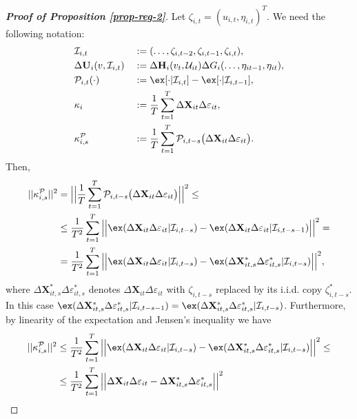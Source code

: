 \begin{proof}[\textnormal{\textbf{Proof of Proposition \ref{prop-reg-2}}}]
Let $\zeta_{i,t} = (u_{i, t}, \eta_{i, t})^T$. We need the following notation:
\begin{alignat*}{2}
&\mathcal{I}_{i,t} &&:= (\ldots, \zeta_{i, t-2}, \zeta_{i, t-1}, \zeta_{i,t}),\\
&\Delta \mathbf{U}_i(v, \mathcal{I}_{i, t}) &&:= \Delta \mathbf{H}_i(v_t, \mathcal{U}_{it}) \Delta G_i(\ldots, \eta_{it-1}, \eta_{it}),\\
&\mathcal{P}_{i,t}(\cdot) &&:= \ex[\cdot|\mathcal{I}_{i, t}] -\ex[\cdot|\mathcal{I}_{i, t-1}], \\
&\kappa_{i} && := \frac{1}{T}\sum_{t=1}^T  \Delta \mathbf{X}_{it}\Delta \varepsilon_{it}, \\
&\kappa_{i, s}^{\mathcal{P}} && := \frac{1}{T}\sum_{t=1}^T \mathcal{P}_{i, t-s}\big( \Delta \mathbf{X}_{it}\Delta \varepsilon_{it}\big).
\end{alignat*}
Then,
\begin{align*}
||\kappa_{i, s}^{\mathcal{P}}||^2 &= \Big|\Big| \frac{1}{T}\sum_{t=1}^T \mathcal{P}_{i, t-s}\big( \Delta \mathbf{X}_{it}\Delta \varepsilon_{it}\big) \Big|\Big|^2 \leq\\
&\leq \frac{1}{T^2} \sum_{t=1}^T \Big|\Big| \ex (\Delta \mathbf{X}_{it}\Delta \varepsilon_{it}|\mathcal{I}_{i, t-s}) -\ex (\Delta \mathbf{X}_{it}\Delta \varepsilon_{it}|\mathcal{I}_{i, t-s-1}) \Big|\Big|^2 =\\
&= \frac{1}{T^2} \sum_{t=1}^T \Big|\Big| \ex (\Delta \mathbf{X}_{it}\Delta \varepsilon_{it}|\mathcal{I}_{i, t-s}) -\ex (\Delta \mathbf{X}_{it, s}^*\Delta \varepsilon_{it, s}^*|\mathcal{I}_{i, t-s}) \Big|\Big|^2,
\end{align*}
where $\Delta \mathbf{X}_{it, s}^*\Delta \varepsilon_{it, s}^*$ denotes $\Delta \mathbf{X}_{it}\Delta \varepsilon_{it}$ with $\zeta_{i, t-s}$ replaced by its i.i.d. copy $\zeta_{i, t-s}^*$. In this case $\ex (\Delta \mathbf{X}_{it, s}^*\Delta \varepsilon_{it, s}^*|\mathcal{I}_{i, t-s -1}) = \ex (\Delta \mathbf{X}_{it, s}^*\Delta \varepsilon_{it, s}^*|\mathcal{I}_{i, t-s})$. Furthermore, by linearity of the expectation and Jensen's inequality we have 
\begin{align*}
||\kappa_{i, s}^{\mathcal{P}}||^2 &\leq \frac{1}{T^2} \sum_{t=1}^T \Big|\Big| \ex (\Delta \mathbf{X}_{it}\Delta \varepsilon_{it}|\mathcal{I}_{i, t-s}) -\ex (\Delta \mathbf{X}_{it, s}^*\Delta \varepsilon_{it, s}^*|\mathcal{I}_{i, t-s}) \Big|\Big|^2 \leq \\
&\leq \frac{1}{T^2} \sum_{t=1}^T \Big|\Big| \Delta \mathbf{X}_{it}\Delta \varepsilon_{it} -\Delta \mathbf{X}_{it, s}^*\Delta \varepsilon_{it, s}^*\Big|\Big|^2
\end{align*}

\end{proof}



